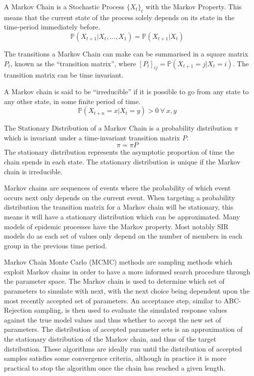 \documentclass[11pt,a4paper]{article}
\newcommand*{\prob}{\mathbb{P}}
\theoremstyle{break}
\begin{document}
  \begin{box_definition}
    A Markov Chain is a Stochastic Process $\{X_t\}_{t}$ with the Markov Property. This means that the current state of the process solely depends on its state in the time-period immediately before.
    \[ \prob(X_{t+1}|X_t,\dots,X_1)=\prob(X_{t+1}|X_t) \]
    \par The transitions a Markov Chain can make can be summarised in a square matrix $P_t$, known as the ``transition matrix'', where $[P_t]_{ij}=\prob(X_{t+1}=j|X_t=i)$. The transition matrix can be time invariant.
    \par A Markov chain is said to be ``irreducible'' if it is possible to go from any state to any other state, in some finite period of time.
    \[ \prob(X_{t+n}=x|X_t=y)>0\ \forall\ x,y \]
    \par The Stationary Distribution of a Markov Chain is a probability distribution $\pi$ which is invariant under a time-invariant transition matrix $P$.
    \[ \pi=\pi P \]
    The stationary distribution represents the asymptotic proportion of time the chain spends in each state. The stationary distribution is unique if the Markov chain is irreducible.
  \end{box_definition}

  \par Markov chains are sequences of events where the probability of which event occurs next only depends on the current event. When targeting a probability distribution the transition matrix for a Markov chain will be stationary, this means it will have a stationary distribution which can be approximated. Many models of epidemic processes have the Markov property. Most notably SIR models do as each set of values only depend on the number of members in each group in the previous time period.

  \par Markov Chain Monte Carlo (MCMC) methods are sampling methods which exploit Markov chains in order to have a more informed search procedure through the parameter space. The Markov chain is used to determine which set of parameters to simulate with next, with the next choice being dependent upon the most recently accepted set of parameters. An acceptance step, similar to ABC-Rejection sampling, is then used to evaluate the simulated response values against the true model values and thus whether to accept the new set of parameters. The distribution of accepted parameter sets is an approximation of the stationary distribution of the Markov chain, and thus of the target distribution. These algorithms are ideally run until the distribution of accepted samples satisfies some convergence criteria, although in practice it is more practical to stop the algorithm once the chain has reached a given length.
\end{document}
